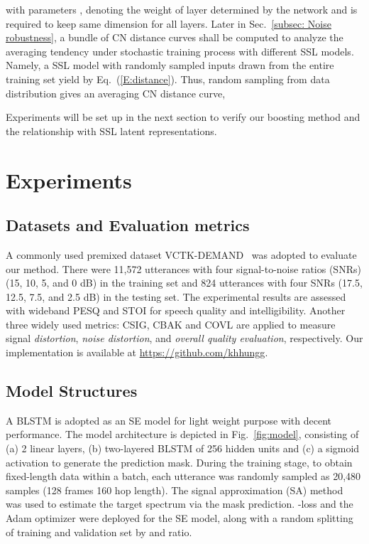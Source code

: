 \documentclass[a4paper]{article}
\begin{document}
with parameters ,  denoting the weight of layer  determined by the network and  is required to keep same dimension for all layers. Later in Sec.~\ref{subsec: Noise robustness}, a bundle of CN distance curves shall be computed to analyze the averaging tendency under stochastic training process with different SSL models. Namely, a SSL model  with randomly sampled inputs  drawn from the entire training set yield  by Eq.~(\ref{E:distance}). Thus, random sampling from data distribution  gives an averaging CN distance curve,

Experiments will be set up in the next section to verify our boosting method and the relationship with SSL latent representations.

















\section{Experiments}

\subsection{Datasets and Evaluation metrics}
A commonly used premixed dataset VCTK-DEMAND~\cite{valentini2016investigating} was adopted to evaluate our method. There were 11,572 utterances with four signal-to-noise ratios (SNRs) (15, 10, 5, and 0 dB) in the training set and 824 utterances with four SNRs (17.5, 12.5, 7.5, and 2.5 dB) in the testing set. The experimental results are assessed with wideband PESQ and STOI for speech quality and intelligibility. Another three widely used metrics: CSIG, CBAK and COVL are applied to measure signal \textit{distortion}, \textit{noise distortion}, and \textit{overall quality evaluation}, respectively. Our implementation is available at \url{https://github.com/khhungg}.


\subsection{Model Structures}
A BLSTM is adopted as an SE model for light weight purpose with decent performance. The model architecture is depicted in Fig.~\ref{fig:model}, consisting of 
(a) 2 linear layers, (b) two-layered BLSTM of 256 hidden units and (c) a sigmoid activation to generate the prediction mask. During the training stage, to obtain fixed-length data within a batch, each utterance was randomly sampled as 20,480 samples (128 frames  160 hop length). The signal approximation (SA) method~\cite{liu2019supervised} was used to estimate the target spectrum via the mask prediction. -loss and the Adam optimizer were deployed for the SE model, along with a random splitting of training and validation set by  and  ratio.
\end{document}
